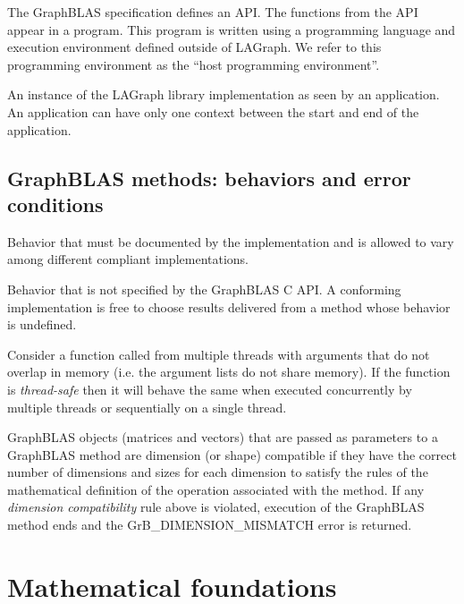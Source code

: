  The GraphBLAS specification defines an API.  
The functions from the API appear in a program.  This program is written using a programming language
and execution environment defined outside of LAGraph.  We refer to this programming environment
as the ``host programming environment''.

  An instance of the LAGraph library implementation
as seen by an application.  An application can have only one context between the 
start and end of the application.  
\glossEnd


\subsection{GraphBLAS methods: behaviors and error conditions}
\glossBegin
{} Behavior that must be documented
by the implementation and is allowed to vary among different
compliant implementations. 

 Behavior that is not specified by the GraphBLAS C API.
A conforming implementation is free to choose results delivered from a method
whose behavior is undefined. 

  Consider a function called from multiple threads with 
arguments that do not overlap in memory (i.e. the argument lists do not share 
memory).  If the function is \emph{thread-safe} then it will behave the same 
when executed concurrently by multiple threads or sequentially on a single 
thread.

 GraphBLAS objects (matrices and vectors) that are
passed as parameters to a GraphBLAS method are dimension (or shape) compatible if
they have the correct number of dimensions and sizes for each dimension to satisfy 
the rules of the mathematical definition of the operation associated with the method. 
If any \emph{dimension compatibility} rule above is violated, execution of the GraphBLAS 
method ends and the {\sf GrB\_DIMENSION\_MISMATCH} error is returned.
\glossEnd


\section{Mathematical foundations}

